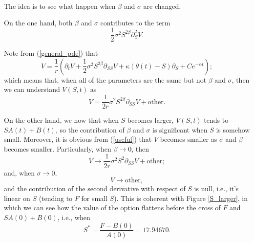 The idea is to see what happen when $\beta$ and $\sigma$ are changed.

On the one hand, both $\beta$  and $\sigma$ contributes to the term 
\begin{equation}
	\frac{1}{2}\sigma^2S^{2\beta}\partial_S^2 V.
\end{equation}

Note from (\ref{general_pde}) that
\begin{equation}
	V = \frac{1}{r}\left(\partial_t V + \frac{1}{2}\sigma^2 S^{2\beta}\partial_{SS} V + \kappa\left(\theta(t) - S\right)\partial_S + Ce^{-\alpha t}\right);
\end{equation}
which means that, when all of the parameters are the same but not $\beta$ and $\sigma$, then we can understand $V(S,t)$ as
\begin{equation}\label{useful}
	V = \frac{1}{2r}\sigma^2 S^{2\beta}\partial_{SS} V + \text{other}.
\end{equation}

On the other hand, we now that when $S$ becomes larger, $V(S,t)$ tends to $S A(t) + B(t)$, so the contribution of $\beta$ and $\sigma$ is significant when $S$ is somehow small. Moreover, it is obvious from (\ref{useful}) that $V$ becomes smaller as $\sigma$ and $\beta$ becomes smaller. Particularly, when $\beta \to 0$, then
\begin{equation}
	V \to  \frac{1}{2r}\sigma^2 S^{2}\partial_{SS} V + \text{other};
\end{equation}
and, when $\sigma\to 0$, 
\begin{equation}
	V \to  \text{other},
\end{equation}
and the contribution of the second derivative with respect of $S$ is null, i.e., it's linear on $S$ (tending to $F$ for small $S$). This is coherent with Figure \ref{S_larger}, in which we can see how the value of the option flattens before the cross of $F$ and $S A(0) + B(0)$, i.e., when
\begin{equation}
	S^* = \frac{F-B(0)}{A(0)} = 17.94670.
\end{equation} 

